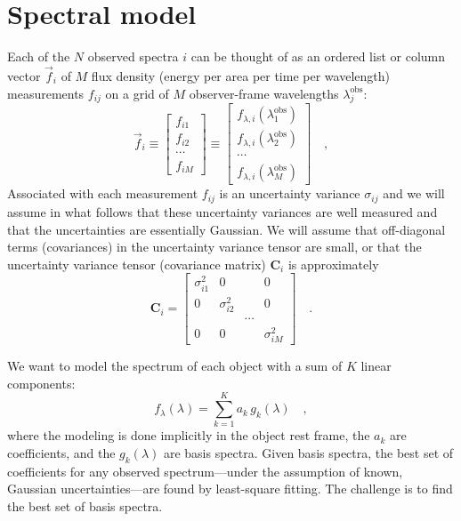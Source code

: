 \documentclass[12pt,preprint]{aastex}
\begin{document}
\section{Spectral model}\label{method}
Each of the $N$ observed spectra $i$ can be thought of as an ordered
list or column vector $\vec{f}_i$ of $M$ flux density (energy per area
per time per wavelength) measurements $f_{ij}$ on a grid of $M$
observer-frame wavelengths $\lambda^{\mathrm{obs}}_j$:
\begin{equation}\label{e1}
\vec{f}_i
\equiv \left[\begin{array}{c} f_{i1} \\
                              f_{i2} \\
                              \cdots \\
                              f_{iM} \end{array}\right]
\equiv \left[\begin{array}{c} f_{\lambda,i}(\lambda^{\mathrm{obs}}_1) \\
                              f_{\lambda,i}(\lambda^{\mathrm{obs}}_2) \\
                                                \cdots \\
                              f_{\lambda,i}(\lambda^{\mathrm{obs}}_M) \end{array}\right]
\quad ,
\end{equation}
Associated with each measurement $f_{ij}$ is an uncertainty variance
$\sigma_{ij}$ and we will assume in what follows that these
uncertainty variances are well measured and that the uncertainties are
essentially Gaussian.  We will assume that off-diagonal terms
(covariances) in the uncertainty variance tensor are small, or that
the uncertainty variance tensor (covariance matrix) $\textbf{C}_i$ is
approximately
\begin{equation}\label{e2}
\textbf{C}_i =
 \left[\begin{array}{cccc} \sigma_{i1}^2 & 0 & & 0 \\
                           0 & \sigma_{i2}^2 & & 0 \\
                           & & \cdots & \\
                           0 & 0 & & \sigma_{iM}^2 \end{array}\right]
\quad .
\end{equation}

We want to model the spectrum of each object with a sum of $K$ linear components:
\begin{equation}\label{e3}
f_{\lambda}(\lambda) = \sum_{k=1}^{K} a_k\,g_k(\lambda)
\quad ,
\end{equation}
where the modeling is done implicitly in the object rest frame, the
$a_k$ are coefficients, and the $g_k(\lambda)$ are basis spectra.
Given basis spectra, the best set of coefficients for any observed
spectrum---under the assumption of known, Gaussian uncertainties---are
found by least-square fitting.  The challenge is to find the best set
of basis spectra.
\end{document}
